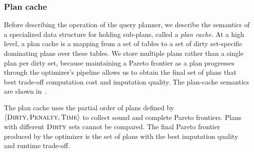 \subsubsection{Plan cache}
Before describing the operation of the query planner, we describe the semantics of a specialized data structure for holding sub-plans, called a \emph{plan cache}.
At a high level, a plan cache is a mapping from a set of tables to a set of dirty set-specific dominating plans over these tables.
We store multiple plans rather than a single plan per dirty set, because maintaining a Pareto frontier as a plan progresses through the optimizer's pipeline
allows us to obtain the final set of plans that best trade-off computation
cost and imputation quality. The plan-cache semantics are shown in~.


\begin{figure}
\end{figure}


The plan cache uses the partial order of plans defined by  $\langle \textsc{Dirty}, \textsc{Penalty}, \textsc{Time} \rangle$ to
collect sound and complete Pareto frontiers. Plans with different $\textsc{Dirty}$ sets cannot be compared. The final
Pareto frontier produced by the optimizer is the set of plans with the best imputation
quality and runtime trade-off.

